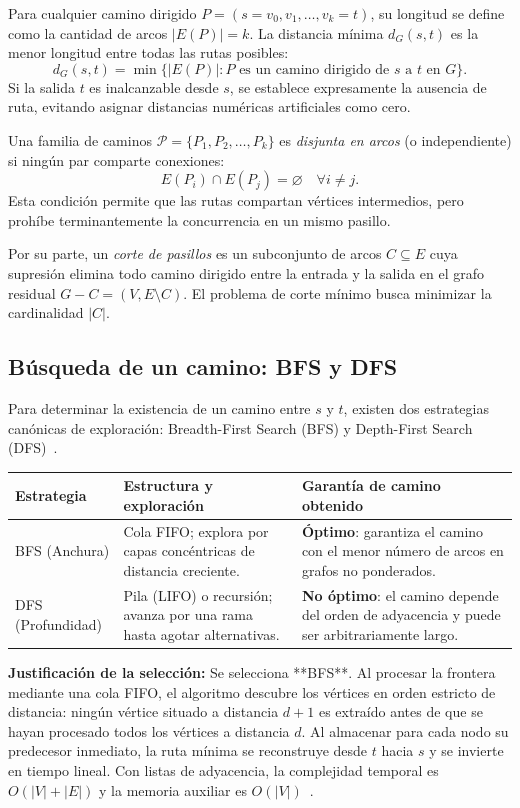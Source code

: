 \documentclass[11pt,a4paper]{article}
\begin{document}
Para cualquier camino dirigido $P = (s = v_0, v_1, \dots, v_k = t)$, su longitud se define como la cantidad de arcos $|E(P)| = k$. La distancia mínima $d_G(s, t)$ es la menor longitud entre todas las rutas posibles:
\[
  d_G(s, t) = \min \{ |E(P)| : P \text{ es un camino dirigido de } s \text{ a } t \text{ en } G \}.
\]
Si la salida $t$ es inalcanzable desde $s$, se establece expresamente la ausencia de ruta, evitando asignar distancias numéricas artificiales como cero.

Una familia de caminos $\mathcal{P} = \{P_1, P_2, \dots, P_k\}$ es \emph{disjunta en arcos} (o independiente) si ningún par comparte conexiones:
\[
  E(P_i) \cap E(P_j) = \varnothing \quad \forall i \neq j.
\]
Esta condición permite que las rutas compartan vértices intermedios, pero prohíbe terminantemente la concurrencia en un mismo pasillo.

Por su parte, un \emph{corte de pasillos} es un subconjunto de arcos $C \subseteq E$ cuya supresión elimina todo camino dirigido entre la entrada y la salida en el grafo residual $G - C = (V, E \setminus C)$. El problema de corte mínimo busca minimizar la cardinalidad $|C|$.

\subsection{Búsqueda de un camino: BFS y DFS}
Para determinar la existencia de un camino entre $s$ y $t$, existen dos estrategias canónicas de exploración: Breadth-First Search (BFS) y Depth-First Search (DFS)~\cite{cormen,mitocw}.

\begin{center}
{\small
\begin{tabularx}{\linewidth}{@{}p{.22\linewidth}XX@{}}
\toprule
\textbf{Estrategia} & \textbf{Estructura y exploración} & \textbf{Garantía de camino obtenido} \\
\midrule
BFS (Anchura) & Cola FIFO; explora por capas concéntricas de distancia creciente. & \textbf{Óptimo}: garantiza el camino con el menor número de arcos en grafos no ponderados. \\
DFS (Profundidad) & Pila (LIFO) o recursión; avanza por una rama hasta agotar alternativas. & \textbf{No óptimo}: el camino depende del orden de adyacencia y puede ser arbitrariamente largo. \\
\bottomrule
\end{tabularx}}
\end{center}

\textbf{Justificación de la selección:} Se selecciona **BFS**. Al procesar la frontera mediante una cola FIFO, el algoritmo descubre los vértices en orden estricto de distancia: ningún vértice situado a distancia $d+1$ es extraído antes de que se hayan procesado todos los vértices a distancia $d$. Al almacenar para cada nodo su predecesor inmediato, la ruta mínima se reconstruye desde $t$ hacia $s$ y se invierte en tiempo lineal. Con listas de adyacencia, la complejidad temporal es $O(|V| + |E|)$ y la memoria auxiliar es $O(|V|)$~\cite{cormen}.
\end{document}
